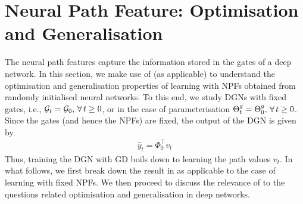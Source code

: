\section{Neural Path Feature: Optimisation and Generalisation}
The neural path features capture the information stored in the gates of a deep network. In this section, we make use of  (as applicable) to understand the optimisation and generalisation properties of learning with NPFs obtained from randomly initialised neural networks. To this end, we study DGNs with fixed gates, i.e., $\mathcal{G}_t=\mathcal{G}_0,\,\forall\,t\geq 0$, or in the case of parameterisation ${\Theta}^g_t={\Theta}^g_0,\,\forall\,t\geq 0$. Since the gates (and hence the NPFs) are fixed, the output of the DGN is given by 
\begin{align}\label{eq:fixednpf}
\hat{y}_t=\Phi^\top_0 v_t
\end{align}
Thus, training the DGN with GD boils down to learning the path values $v_t$. In what follows, we first break down the result in  as applicable to the case of learning with fixed NPFs. We then proceed to discuss the relevance of  to the questions related optimisation and generalisation in deep networks.\\

